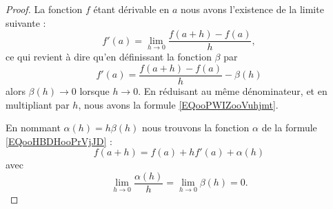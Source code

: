 \begin{proof}
	La fonction \( f\) étant dérivable en \( a\) nous avons l'existence de la limite suivante :
	\begin{equation}
		f'(a)=\lim_{h\to 0} \frac{ f(a+h)-f(a) }{ h },
	\end{equation}
	ce qui revient à dire qu'en définissant la fonction \( \beta\) par
	\begin{equation}
		f'(a)=\frac{ f(a+h)-f(a) }{ h }-\beta(h)
	\end{equation}
	alors \( \beta(h)\to 0\) lorsque \( h\to 0\). En réduisant au même dénominateur, et en multipliant par \( h\), nous avons la formule \eqref{EQooPWIZooVuhjmt}.

	En nommant \( \alpha(h)=h\beta(h)\) nous trouvons la fonction \( \alpha\) de la formule \eqref{EQooHBDHooPrVjJD} :
	\begin{equation}
		f(a+h)=f(a)+hf'(a)+\alpha(h)
	\end{equation}
	avec
	\begin{equation}
		\lim_{h\to 0} \frac{ \alpha(h) }{ h }=\lim_{h\to 0} \beta(h)=0.
	\end{equation}
\end{proof}

